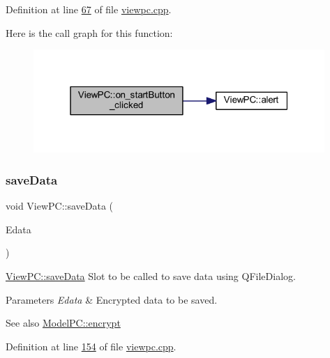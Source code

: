 Definition at line \mbox{\hyperlink{viewpc_8cpp_source_l00067}{67}} of file \mbox{\hyperlink{viewpc_8cpp_source}{viewpc.\+cpp}}.

Here is the call graph for this function\+:
\nopagebreak
\begin{figure}[H]
\begin{center}
\leavevmode
\includegraphics[width=313pt]{class_view_p_c_a456d75b7c5d3a089302a576e7359f1f4_cgraph}
\end{center}
\end{figure}
\mbox{\label{class_view_p_c_aaff156103970be7c777beedaf0020604}} 
\subsubsection{\texorpdfstring{save\+Data}{saveData}}
{\footnotesize\ttfamily void View\+P\+C\+::save\+Data (\begin{DoxyParamCaption}\item[{Q\+Byte\+Array}]{Edata }\end{DoxyParamCaption})\hspace{0.3cm}{\ttfamily [slot]}}



\mbox{\hyperlink{class_view_p_c_aaff156103970be7c777beedaf0020604}{View\+P\+C\+::save\+Data}} Slot to be called to save data using Q\+File\+Dialog. 


\begin{DoxyParams}{Parameters}
{\em Edata} & Encrypted data to be saved. \\
\hline
\end{DoxyParams}
\begin{DoxySeeAlso}{See also}
\mbox{\hyperlink{class_model_p_c_a8ef76567bc0c0307b4e2547c46536e51}{Model\+P\+C\+::encrypt}} 
\end{DoxySeeAlso}


Definition at line \mbox{\hyperlink{viewpc_8cpp_source_l00154}{154}} of file \mbox{\hyperlink{viewpc_8cpp_source}{viewpc.\+cpp}}.


